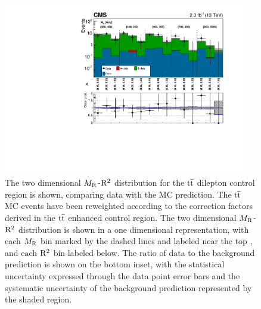 \begin{figure}[!htb] \centering
\includegraphics[width=0.95\textwidth]{figs/analysis13TeV/TTBarWJets/Razor_TTBarDileptonCrossCheckRegion_MRRsqUnrolled_MR300Rsq0p15_all_Logy.pdf}
\caption{ The two dimensional $M_\mathrm{R}$-$\mathrm{R}^2$ distribution for the $\mathrm{t}\overline{\mathrm{t}}$ dilepton control region is shown, 
comparing data with the MC prediction. The $\mathrm{t}\overline{\mathrm{t}}$ MC events have been reweighted according to the correction factors
derived in the $\mathrm{t}\overline{\mathrm{t}}$ enhanced control region.  The two dimensional $M_\mathrm{R}$-$\mathrm{R}^2$ distribution is shown
in a one dimensional representation, with each $M_\mathrm{R}$ bin marked by the dashed lines and labeled near the top
, and each $\mathrm{R}^2$ bin labeled below. The ratio of data to the background prediction is shown on the bottom inset, with
the statistical uncertainty expressed through the data point error bars and the systematic uncertainty of the
background prediction represented by the shaded region. 
}
\label{fig:TTBarDileptonCR_MRRsqUnrolled}
\end{figure}

